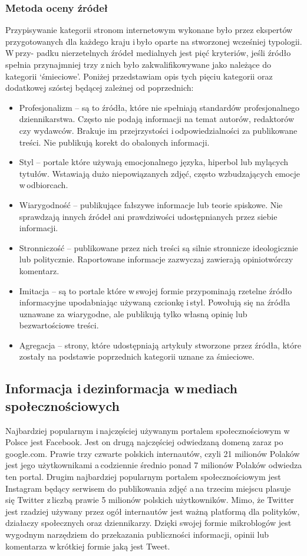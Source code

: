\subsubsection{Metoda oceny źródeł}
Przypisywanie kategorii stronom internetowym wykonane było przez ekspertów przygotowanych dla każdego kraju i\,było oparte na stworzonej wcześniej typologii\cite{neudertpolarization2018}. W\,przy- padku nierzetelnych źródeł medialnych jest pięć kryteriów, jeśli źródło spełnia przynajmniej trzy z\,nich było zakwalifikowywane jako należące do kategorii ‘śmieciowe’. Poniżej przedstawiam opis tych pięciu kategorii oraz dodatkowej szóstej będącej zależnej od poprzednich:
\begin{itemize}
    \item Profesjonalizm – są to źródła, które nie spełniają standardów profesjonalnego dziennikarstwa. Często nie podają informacji na temat autorów, redaktorów czy wydawców. Brakuje im przejrzystości i\,odpowiedzialności za publikowane treści. Nie publikują korekt do obalonych informacji.
    \item Styl – portale które używają emocjonalnego języka, hiperbol lub mylących tytułów. Wstawiają dużo niepowiązanych zdjęć, często wzbudzających emocje w\,odbiorcach.
    \item Wiarygodność – publikujące fałszywe informacje lub teorie spiskowe. Nie sprawdzają innych źródeł ani prawdziwości udostępnianych przez siebie informacji.
    \item Stronniczość – publikowane przez nich treści są silnie stronnicze ideologicznie lub politycznie. Raportowane informacje zazwyczaj zawierają opiniotwórczy komentarz.
    \item Imitacja – są to portale które w\,swojej formie przypominają rzetelne źródło informacyjne upodabniając używaną czcionkę i\,styl. Powołują się na źródła uznawane za wiarygodne, ale publikują tylko własną opinię lub bezwartościowe treści.
    \item Agregacja – strony, które udostępniają artykuły stworzone przez źródła, które zostały na podstawie poprzednich kategorii uznane za śmieciowe.
\end{itemize}

\subsection{Informacja i\,dezinformacja w\,mediach społecznościowych}
Najbardziej popularnym i\,najczęściej używanym portalem społecznościowym w\,Polsce jest Facebook. Jest on drugą najczęściej odwiedzaną domeną zaraz po google.com. Prawie trzy czwarte polskich internautów, czyli 21 milionów Polaków jest jego użytkownikami a\,codziennie średnio ponad 7 milionów Polaków odwiedza ten portal\cite{GemiusInternet2019}. Drugim najbardziej popularnym portalem społecznościowym jest Instagram będący serwisem do publikowania zdjęć a\,na trzecim miejscu plasuje się Twitter z\,liczbą prawie 5 milionów polskich użytkowników\cite{GemiusSerwisy2019}. Mimo, że Twitter jest rzadziej używany przez ogół internautów jest ważną platformą dla polityków, działaczy społecznych oraz dziennikarzy\cite{gorwa2017computational}. Dzięki swojej formie mikroblogów jest wygodnym narzędziem do przekazania publiczności informacji, opinii lub komentarza w\,krótkiej formie jaką jest Tweet.
